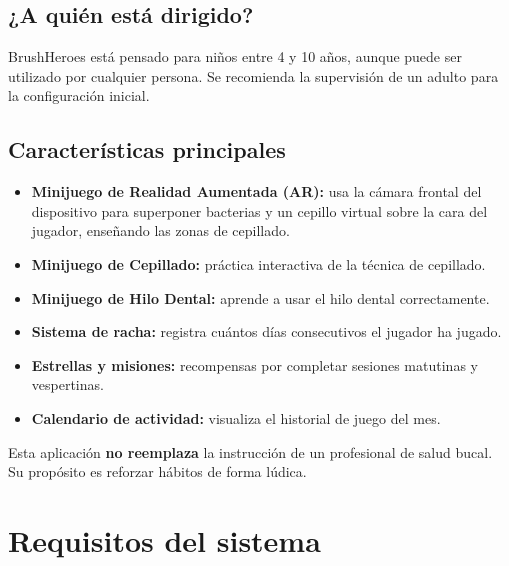 \documentclass[12pt, a4paper]{article}
\begin{document}
\subsection{¿A quién está dirigido?}

BrushHeroes está pensado para niños entre 4 y 10 años, aunque puede ser utilizado por
cualquier persona. Se recomienda la supervisión de un adulto para la configuración inicial.

\subsection{Características principales}

\begin{itemize}[leftmargin=1.5cm]
  \item \textbf{Minijuego de Realidad Aumentada (AR):} usa la cámara frontal del dispositivo
        para superponer bacterias y un cepillo virtual sobre la cara del jugador, enseñando
        las zonas de cepillado.
  \item \textbf{Minijuego de Cepillado:} práctica interactiva de la técnica de cepillado.
  \item \textbf{Minijuego de Hilo Dental:} aprende a usar el hilo dental correctamente.
  \item \textbf{Sistema de racha:} registra cuántos días consecutivos el jugador ha jugado.
  \item \textbf{Estrellas y misiones:} recompensas por completar sesiones matutinas y vespertinas.
  \item \textbf{Calendario de actividad:} visualiza el historial de juego del mes.
\end{itemize}

\begin{notebox}
  Esta aplicación \textbf{no reemplaza} la instrucción de un profesional de salud bucal.
  Su propósito es reforzar hábitos de forma lúdica.
\end{notebox}

\section{Requisitos del sistema}
\end{document}
